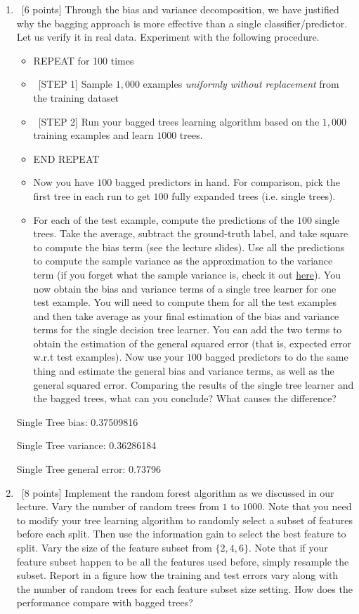 \documentclass[12pt, fullpage,letterpaper]{article}
\begin{document}
\begin{enumerate}
\begin{enumerate}
	\bigskip

	\item~[6 points] Through the bias and variance decomposition, we have justified why the bagging approach is more effective than a single classifier/predictor. Let us verify it in real data. Experiment with the following procedure.
	\begin{itemize}
		\item REPEAT for 100 times
		\item ~[STEP 1] Sample $1,000$ examples \textit{uniformly without replacement} from the training dataset
		\item ~[STEP 2] Run your bagged trees learning algorithm based on the $1,000$ training examples and learn $1000$ trees.
		\item END REPEAT 
		\item Now you have $100$ bagged predictors in hand. For comparison, pick the first tree in each run to get $100$ fully expanded trees (i.e. single trees). 
		\item 	For each of the test example, compute the predictions of the $100$ single trees. Take the average, subtract the ground-truth label, and take square to compute the bias term (see the lecture slides). Use all the predictions to compute the sample variance  as the approximation to the variance term (if you forget what the sample variance is, check it out 
		\href{http://www.randomservices.org/random/sample/Variance.html}{here}). You now obtain the bias and variance terms of a single tree learner for one test example. You will need to compute them for all the test examples and then take average as your final estimation of the bias and variance terms for the single decision tree learner. You can add the two terms to obtain the estimation of the general squared error (that is, expected error w.r.t test examples). Now use your $100$ bagged predictors to do the same thing and estimate the general bias and variance terms, as well as the general squared error.  Comparing the results of the single tree learner and the bagged trees, what can you conclude?  What causes the difference?  
	\end{itemize}
	\bigskip
	Single Tree bias: 0.37509816
	
	Single Tree variance: 0.36286184
	
	Single Tree general error: 0.73796
	\bigskip
	\item~[8 points] Implement the random forest algorithm as we discussed in our lecture. Vary the number of random trees from $1$ to $1000$. Note that you need to modify your tree learning algorithm to randomly select a subset of features before each split. Then use the information gain to select the best feature to split.  Vary the size of the feature subset from $\{2, 4, 6\}$. Note that if your feature subset happen to be all the features used before, simply resample the subset.  Report in a figure how the training and test errors vary along with the number of random trees for each feature subset size setting. How does the performance compare with bagged trees? 


\end{enumerate}
\end{enumerate}
\end{document}
